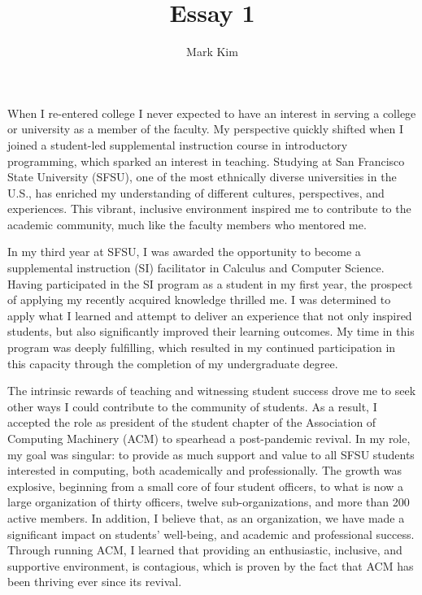 \documentclass[12pt]{article}
\author{Mark Kim}
\title{Essay 1}
\begin{document}
\maketitle

When I re-entered college I never expected to have an interest in serving a college or university as a member of the faculty.  My
perspective quickly shifted when I joined a student-led supplemental instruction course in introductory programming, which sparked an
interest in teaching.  Studying at San Francisco State University (SFSU), one of the most ethnically diverse universities in the U.S., has enriched
my understanding of different cultures, perspectives, and experiences. This vibrant, inclusive environment inspired me to contribute to the
academic community, much like the faculty members who mentored me.

In my third year at SFSU, I was awarded the opportunity to become a supplemental instruction (SI) facilitator in Calculus and Computer Science.
Having participated in the SI program as a student in my first year, the prospect of applying my recently acquired knowledge thrilled me.  I
was determined to apply what I learned and attempt to deliver an experience that not only inspired students, but also significantly
improved their learning outcomes.  My time in this program was deeply fulfilling, which resulted in my continued participation in this
capacity through the completion of my undergraduate degree.

The intrinsic rewards of teaching and witnessing student success drove me to seek other ways I could contribute to the community of
students.  As a result, I accepted the role as president of the student chapter of the Association of Computing Machinery (ACM) to spearhead a
post-pandemic revival.  In my role, my goal was singular: to provide as much support and value to all SFSU students interested in computing,
both academically and professionally.
The growth was explosive, beginning from a small core of four student officers, to what is now a large organization of thirty officers,
twelve sub-organizations, and more than 200 active members.  In addition, I believe that, as an organization, we have made a significant
impact on students' well-being, and academic and professional success. Through running ACM, I learned that providing an enthusiastic, inclusive, and
supportive environment, is contagious, which is proven by the fact that ACM has been thriving ever since its revival.
\end{document}
